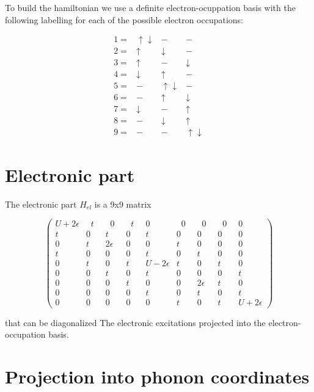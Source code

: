 To build the hamiltonian we use a definite electron-ocuppation basis with the following labelling for each of the possible electron occupations:

\begin{equation}\label{eq:basis-set}\begin{array}{cccc}
1= & \uparrow \downarrow & - & - \\
2= & \uparrow & \downarrow & - \\
3= & \uparrow & - & \downarrow \\
4= & \downarrow & \uparrow & - \\
5= & - & \uparrow \downarrow & - \\
6= & - & \uparrow & \downarrow \\
7= & \downarrow & - & \uparrow \\
8= & - & \downarrow & \uparrow \\
9= & - & - & \uparrow \downarrow \end{array}\end{equation}


\section{Electronic part}

The electronic part $H_{el}$ is a 9x9 matrix

\begin{equation}\label{eq:electronic-matrix}
\left( \begin{array}{ccccccccc} 
U+2\epsilon &\;\;t\;\;&\;\;0\;\;&\;\;t\;\;&0&\;\;0\;\;&\;\;0\;\;&\;\;0\;\;&0 \\
t&0&t&0&t&0&0&0&0 \\
0&t&2\epsilon &0&0&t&0&0&0 \\
t&0&0&0&t&0&t&0&0 \\
0&t&0&t&U-2\epsilon &t&0&t&0 \\
0&0&t&0&t&0&0&0&t \\
0&0&0&t&0&0&2\epsilon &t&0 \\
0&0&0&0&t&0&t&0&t \\
0&0&0&0&0&t&0&t&U+2\epsilon  \end{array} \right)\end{equation}

that can be diagonalized The electronic excitations projected into the electron-occupation basis.


\section{Projection into phonon coordinates}

